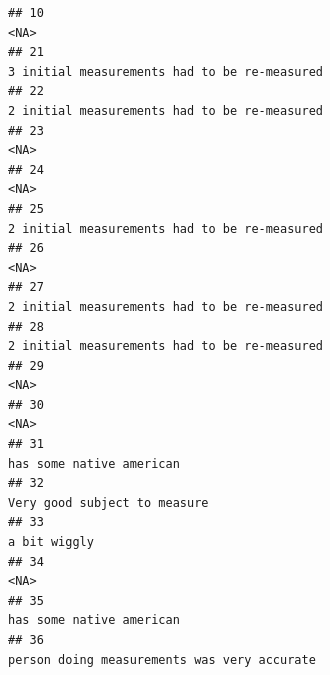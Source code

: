 \documentclass[]{article}
\begin{document}
\begin{verbatim}
## 10                                                                                                                                                 <NA>
## 21                                                                                                         3 initial measurements had to be re-measured
## 22                                                                                                         2 initial measurements had to be re-measured
## 23                                                                                                                                                 <NA>
## 24                                                                                                                                                 <NA>
## 25                                                                                                         2 initial measurements had to be re-measured
## 26                                                                                                                                                 <NA>
## 27                                                                                                         2 initial measurements had to be re-measured
## 28                                                                                                         2 initial measurements had to be re-measured
## 29                                                                                                                                                 <NA>
## 30                                                                                                                                                 <NA>
## 31                                                                                                                             has some native american
## 32                                                                                                                         Very good subject to measure
## 33                                                                                                                                         a bit wiggly
## 34                                                                                                                                                 <NA>
## 35                                                                                                                             has some native american
## 36                                                                                                          person doing measurements was very accurate

\end{verbatim}
\end{document}
